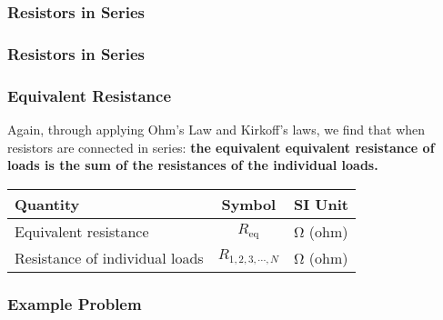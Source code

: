 \documentclass[12pt,aspectratio=169]{beamer}
\newcommand{\mb}[1]{\mathbf{#1}}
\newcommand{\eq}[2]{\vspace{#1}{\Large\begin{displaymath}#2\end{displaymath}}}
\begin{document}
\begin{frame}
  \frametitle{Resistors in Series}
  \begin{center}
  \end{center}
\end{frame}

\begin{frame}
  \frametitle{Resistors in Series}
  \frametitle{Equivalent Resistance}
  Again, through applying Ohm's Law and Kirkoff's laws, we find that when
  resistors are connected in series: \textbf{the equivalent equivalent
    resistance of loads is the sum of the resistances of the individual
    loads.}

  \eq{-0.3in}{
    \boxed{R_\mathrm{eq}=R_1 + R_2 + \cdots + R_N}
  }

  \begin{center}
    \begin{tabular}{l|c|l}
      \rowcolor{pink}
      \textbf{Quantity} & \textbf{Symbol} & \textbf{SI Unit} \\ \hline
      Equivalent resistance          & $R_\mathrm{eq}$ & \si{\ohm} (ohm) \\
      Resistance of individual loads & $R_{1,2,3,\cdots,N}$ & \si{\ohm} (ohm) \\
    \end{tabular}
  \end{center}
\end{frame}


\begin{frame}
  \frametitle{Example Problem}
%
%    
\end{frame}
\end{document}
